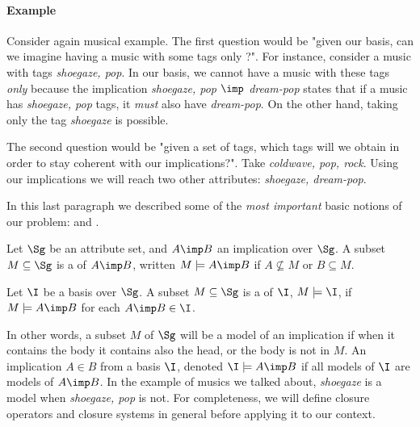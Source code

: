 \paragraph{Example} Consider again musical example. The first question would be 
"given our basis, can we imagine having a music with some tags only ?". For 
instance, consider a music with tags \textit{shoegaze, pop}. In our basis, we 
cannot have a music with these tags \textit{only} because the implication 
\textit{shoegaze, pop} $\imp$ \textit{dream-pop} states that if a music has 
\textit{shoegaze, pop} tags, it \textit{must} also have \textit{dream-pop}. On 
the other hand, taking only the tag \textit{shoegaze} is possible. 

The second question would be "given a set of tags, which tags will we obtain
in order to stay coherent with our implications?". Take \textit{coldwave, pop, 
rock}. Using our implications we will reach two other attributes: 
\textit{shoegaze, dream-pop}.

\vspace{1.2em}

In this last paragraph we described some of the \textit{most important} basic 
notions of our problem:  and .

\begin{definition} Let $\Sg$ be an attribute 
set, and
$A \imp B$ an implication over $\Sg$. A subset $M \subseteq \Sg$ is a 
 of $A \imp B$, written $M \models A \imp B$ if $A \nsubseteq M$ 
or $B \subseteq M$.

\end{definition}

\begin{definition} Let $\I$ be a basis 
over 
$\Sg$. A subset $M \subseteq \Sg$ is a  of $\I$, $M \models \I$, 
if $M \models A \imp B$ for each $A \imp B \in \I$.

\end{definition}

In other words, a subset $M$ of $\Sg$ will be a model of an implication if when 
it contains the body it contains also the head, or the body is not in $M$. An 
implication $A \in B$  from a basis $\I$, denoted $\I \models A 
\imp B$ if all models of $\I$ are models of $A \imp B$. In the example of 
musics we talked about, \textit{shoegaze} is a model when \textit{shoegaze, 
pop} is not. For completeness, we will define closure operators and closure 
systems in general before applying it to our context.


